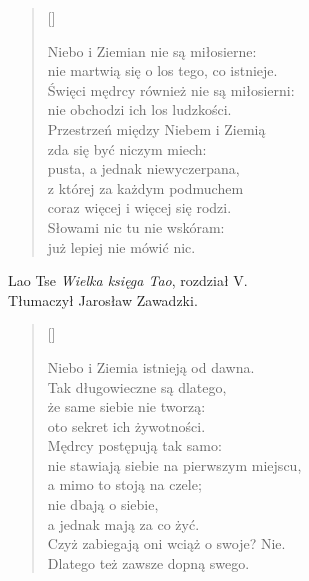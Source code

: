 \documentclass[a4paper,11pt]{article}
\newcommand{\attribB}[1]{#1}
\begin{document}
\settowidth{\versewidth}{nie martwią się o los tego, co istnieje.}

\begin{verse}[\versewidth]

  Niebo i Ziemian nie są miłosierne: \\
  nie martwią się o los tego, co istnieje. \\
  Święci mędrcy również nie są miłosierni: \\
  nie obchodzi ich los ludzkości. \\
  Przestrzeń między Niebem i Ziemią \\
  zda się być niczym miech: \\
  pusta, a jednak niewyczerpana, \\
  z której za każdym podmuchem \\
  coraz więcej i więcej się rodzi. \\
  Słowami nic tu nie wskóram: \\
  już lepiej nie mówić nic.
\end{verse}


\attribB{Lao Tse \emph{Wielka księga Tao}, rozdział V. \\
  Tłumaczył Jarosław Zawadzki.}

\vspace{\spaceThree}



\settowidth{\versewidth}{Niebo i Ziemia istnieją od dawna.}

\begin{verse}[\versewidth]

  Niebo i Ziemia istnieją od dawna. \\
  Tak długowieczne są dlatego, \\
  że same siebie nie tworzą: \\
  oto sekret ich żywotności. \\
  Mędrcy postępują tak samo: \\
  nie stawiają siebie na pierwszym miejscu, \\
  a mimo to stoją na czele; \\
  nie dbają o siebie, \\
  a jednak mają za co żyć. \\
  Czyż zabiegają oni wciąż o swoje? Nie. \\
  Dlatego też zawsze dopną swego.

\end{verse}
\end{document}

